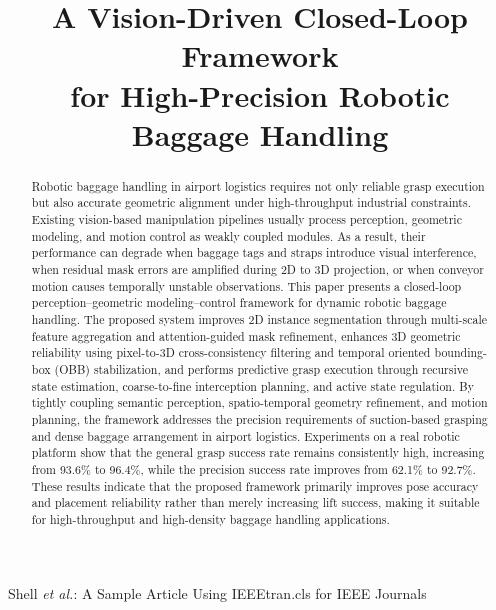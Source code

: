 \documentclass[lettersize,journal]{IEEEtran}
\begin{document}
\title{A Vision-Driven Closed-Loop Framework  \\ for High-Precision Robotic Baggage Handling}



%
{Shell \MakeLowercase{\textit{et al.}}: A Sample Article Using IEEEtran.cls for IEEE Journals}



\maketitle

\begin{abstract}
Robotic baggage handling in airport logistics requires not only reliable grasp execution but also accurate geometric alignment under high-throughput industrial constraints. Existing vision-based manipulation pipelines usually process perception, geometric modeling, and motion control as weakly coupled modules. As a result, their performance can degrade when baggage tags and straps introduce visual interference, when residual mask errors are amplified during 2D to 3D projection, or when conveyor motion causes temporally unstable observations. This paper presents a closed-loop perception--geometric modeling--control framework for dynamic robotic baggage handling. The proposed system improves 2D instance segmentation through multi-scale feature aggregation and attention-guided mask refinement, enhances 3D geometric reliability using pixel-to-3D cross-consistency filtering and temporal oriented bounding-box (OBB) stabilization, and performs predictive grasp execution through recursive state estimation, coarse-to-fine interception planning, and active state regulation. By tightly coupling semantic perception, spatio-temporal geometry refinement, and motion planning, the framework addresses the precision requirements of suction-based grasping and dense baggage arrangement in airport logistics. Experiments on a real robotic platform show that the general grasp success rate remains consistently high, increasing from 93.6\% to 96.4\%, while the precision success rate improves from 62.1\% to 92.7\%. These results indicate that the proposed framework primarily improves pose accuracy and placement reliability rather than merely increasing lift success, making it suitable for high-throughput and high-density baggage handling applications.
\end{abstract}
\end{document}
